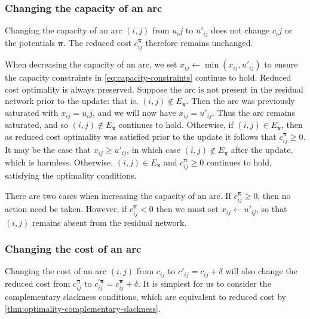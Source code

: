\subsubsection{Changing the capacity of an arc}

Changing the capacity of an arc $(i,j)$ from $u_ij$ to $u'_{ij}$ does not change $c_ij$ or the potentials $\boldsymbol{\pi}$. The reduced cost $c_{ij}^{\boldsymbol{\pi}}$ therefore remains unchanged.

When decreasing the capacity of an arc, we set $x_{ij} \gets \min\left(x_{ij},u'_{ij}\right)$ to ensure the capacity constraints in \cref{eq:capacity-constraints} continue to hold\footnotemark. Reduced cost optimality is always preserved. Suppose the arc is not present in the residual network prior to the update: that is, $(i,j) \not \in E_\mathbf{x}$. Then the arc was previously saturated with $x_{ij} = u_ij$, and we will now have $x_{ij} = u'_{ij}$. Thus the arc remains saturated, and so $(i,j) \not \in E_\mathbf{x}$ continues to hold. Otherwise, if $(i,j) \in E_\mathbf{x}$, then as reduced cost optimality was satisfied prior to the update it follows that $c_{ij}^{\boldsymbol{\pi}} \geq 0$. It may be the case that $x_{ij} \geq u'_{ij}$, in which case $(i,j) \not \in E_\mathbf{x}$ after the update, which is harmless. Otherwise, $(i,j) \in E_\mathbf{x}$ and $c_{ij}^{\boldsymbol{\pi}} \geq 0$ continues to hold, satisfying the optimality conditions.

There are two cases when increasing the capacity of an arc. If $c_{ij}^{\boldsymbol{\pi}} \geq 0$, then no action need be taken. However, if $c_{ij}^{\boldsymbol{\pi}} < 0$ then we must set $x_{ij} \gets u'_{ij}$, so that $(i,j)$ remains absent from the residual network.

\subsubsection{Changing the cost of an arc}

Changing the cost of an arc $(i,j)$ from $c_{ij}$ to $c'_{ij} = c_{ij} + \delta$ will also change the reduced cost from $c_{ij}^{\boldsymbol{\pi}}$ to $c_{ij}^{\prime\boldsymbol{\pi}} = c_{ij}^{\boldsymbol{\pi}} + \delta$. It is simplest for us to consider the complementary slackness conditions, which are equivalent to reduced cost by \cref{thm:optimality-complementary-slackness}.

